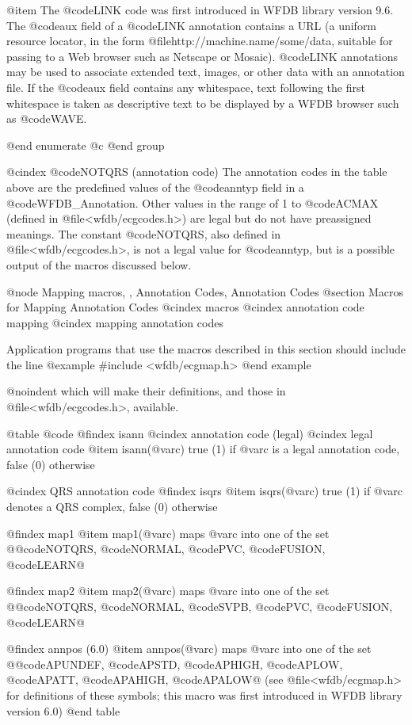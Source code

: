 {{{{{{{{{{@item
The @code{LINK} code was first introduced in WFDB library version 9.6.  The
@code{aux} field of a @code{LINK} annotation contains a URL (a uniform
resource locator, in the form @file{http://machine.name/some/data},
suitable for passing to a Web browser such as Netscape or Mosaic).  @code{LINK}
annotations may be used to associate extended text, images, or other data with
an annotation file.  If the @code{aux} field contains any whitespace, text
following the first whitespace is taken as descriptive text to be displayed by
a WFDB browser such as @code{WAVE}.

@end enumerate
@c @end group

@cindex @code{NOTQRS} (annotation code)
The annotation codes in the table above are the predefined values of the
@code{anntyp} field in a @code{WFDB_Annotation}.  Other values in the range
of 1 to @code{ACMAX} (defined in @file{<wfdb/ecgcodes.h>}) are legal but
do not have preassigned meanings.  The constant @code{NOTQRS}, also defined in
@file{<wfdb/ecgcodes.h>}, is not a legal value for @code{anntyp}, but is
a possible output of the macros discussed below.

@node    Mapping macros, , Annotation Codes, Annotation Codes
@section Macros for Mapping Annotation Codes
@cindex macros
@cindex annotation code mapping
@cindex mapping annotation codes

Application programs that use the macros described in this section
should include the line
@example
#include <wfdb/ecgmap.h>
@end example

@noindent
which will make their definitions, and those in @file{<wfdb/ecgcodes.h>},
available.

@table @code
@findex isann
@cindex annotation code (legal)
@cindex legal annotation code
@item isann(@var{c})
true (1) if @var{c} is a legal annotation code, false (0)
otherwise

@cindex QRS annotation code
@findex isqrs
@item isqrs(@var{c})
true (1) if @var{c} denotes a QRS complex, false (0) otherwise

@findex map1
@item map1(@var{c})
maps @var{c} into one of the set @{@code{NOTQRS}, @code{NORMAL},
@code{PVC}, @code{FUSION}, @code{LEARN}@}

@findex map2
@item map2(@var{c})
maps @var{c} into one of the set @{@code{NOTQRS}, @code{NORMAL},
@code{SVPB}, @code{PVC}, @code{FUSION}, @code{LEARN}@}

@findex annpos (6.0)
@item annpos(@var{c})
maps @var{c} into one of the set @{@code{APUNDEF}, @code{APSTD},
@code{APHIGH}, @code{APLOW}, @code{APATT}, @code{APAHIGH},
@code{APALOW}@} (see @file{<wfdb/ecgmap.h>} for definitions of these
symbols;  this macro was first introduced in WFDB library version 6.0)
@end table

}}}}}}}}}}
